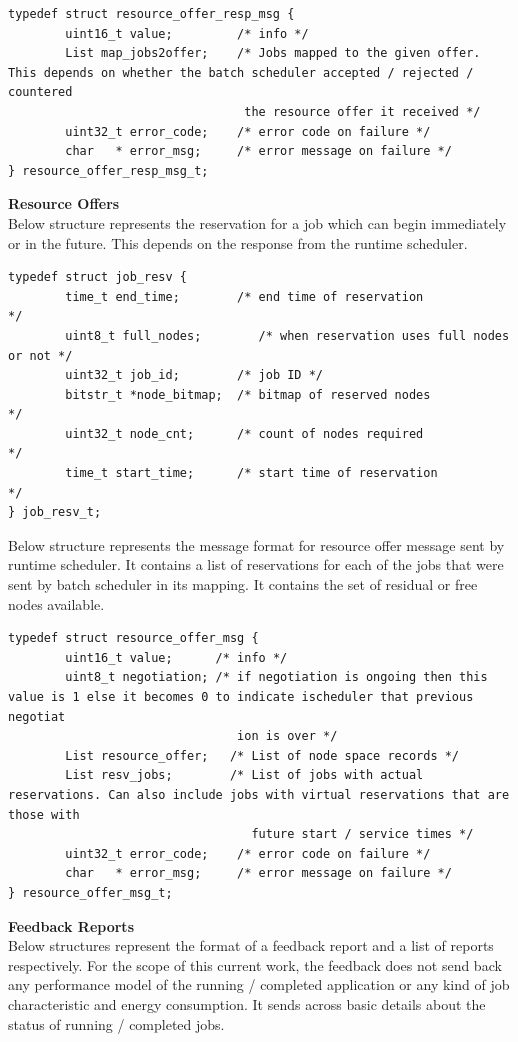 \begin{lstlisting}[mathescape]
typedef struct resource_offer_resp_msg {
        uint16_t value;         /* info */
        List map_jobs2offer;    /* Jobs mapped to the given offer. This depends on whether the batch scheduler accepted / rejected / countered
                                 the resource offer it received */
        uint32_t error_code;    /* error code on failure */
        char   * error_msg;     /* error message on failure */
} resource_offer_resp_msg_t;
\end{lstlisting}
\textbf{Resource Offers}\\
Below structure represents the reservation for a job which can begin immediately or in the future. This depends on the response from the runtime scheduler.
\begin{lstlisting}[mathescape]
typedef struct job_resv {
        time_t end_time;        /* end time of reservation              */
        uint8_t full_nodes;        /* when reservation uses full nodes or not */
        uint32_t job_id;        /* job ID */
        bitstr_t *node_bitmap;  /* bitmap of reserved nodes             */
        uint32_t node_cnt;      /* count of nodes required              */
        time_t start_time;      /* start time of reservation            */
} job_resv_t;
\end{lstlisting}
Below structure represents the message format for resource offer message sent by runtime scheduler. It contains a list of reservations for each of the jobs that were sent by batch scheduler in its mapping. It contains the set of residual or free nodes available.
\begin{lstlisting}[mathescape]
typedef struct resource_offer_msg {
        uint16_t value;      /* info */
        uint8_t negotiation; /* if negotiation is ongoing then this value is 1 else it becomes 0 to indicate ischeduler that previous negotiat
                                ion is over */
        List resource_offer;   /* List of node space records */
        List resv_jobs;        /* List of jobs with actual reservations. Can also include jobs with virtual reservations that are those with
                                  future start / service times */
        uint32_t error_code;    /* error code on failure */
        char   * error_msg;     /* error message on failure */
} resource_offer_msg_t;
\end{lstlisting}
\textbf{Feedback Reports}\\
Below structures represent the format of a feedback report and a list of reports respectively. For the scope of this current work, the feedback does not send back any performance model of the running / completed application or any kind of job characteristic and energy consumption. It sends across basic details about the status of running / completed jobs.
